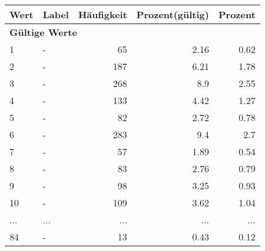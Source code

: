      \begin{longtable}{lXrrr}
     \toprule
     \textbf{Wert} & \textbf{Label} & \textbf{Häufigkeit} & \textbf{Prozent(gültig)} & \textbf{Prozent} \\
     \endhead
     \midrule
     \multicolumn{5}{l}{\textbf{Gültige Werte}}\\
        1 & \multicolumn{1}{X}{-} & %
          \num{65} &
          \num[round-mode=places,round-precision=2]{2.16} &
          \num[round-mode=places,round-precision=2]{0.62} \\
        2 & \multicolumn{1}{X}{-} & %
          \num{187} &
          \num[round-mode=places,round-precision=2]{6.21} &
          \num[round-mode=places,round-precision=2]{1.78} \\
        3 & \multicolumn{1}{X}{-} & %
          \num{268} &
          \num[round-mode=places,round-precision=2]{8.9} &
          \num[round-mode=places,round-precision=2]{2.55} \\
        4 & \multicolumn{1}{X}{-} & %
          \num{133} &
          \num[round-mode=places,round-precision=2]{4.42} &
          \num[round-mode=places,round-precision=2]{1.27} \\
        5 & \multicolumn{1}{X}{-} & %
          \num{82} &
          \num[round-mode=places,round-precision=2]{2.72} &
          \num[round-mode=places,round-precision=2]{0.78} \\
        6 & \multicolumn{1}{X}{-} & %
          \num{283} &
          \num[round-mode=places,round-precision=2]{9.4} &
          \num[round-mode=places,round-precision=2]{2.7} \\
        7 & \multicolumn{1}{X}{-} & %
          \num{57} &
          \num[round-mode=places,round-precision=2]{1.89} &
          \num[round-mode=places,round-precision=2]{0.54} \\
        8 & \multicolumn{1}{X}{-} & %
          \num{83} &
          \num[round-mode=places,round-precision=2]{2.76} &
          \num[round-mode=places,round-precision=2]{0.79} \\
        9 & \multicolumn{1}{X}{-} & %
          \num{98} &
          \num[round-mode=places,round-precision=2]{3.25} &
          \num[round-mode=places,round-precision=2]{0.93} \\
        10 & \multicolumn{1}{X}{-} & %
          \num{109} &
          \num[round-mode=places,round-precision=2]{3.62} &
          \num[round-mode=places,round-precision=2]{1.04} \\
       ... & ... & ... & ... & ... \\
        84 & \multicolumn{1}{X}{-} & %
          \num{13} &
          \num[round-mode=places,round-precision=2]{0.43} &
          \num[round-mode=places,round-precision=2]{0.12} \\


\end{longtable}
